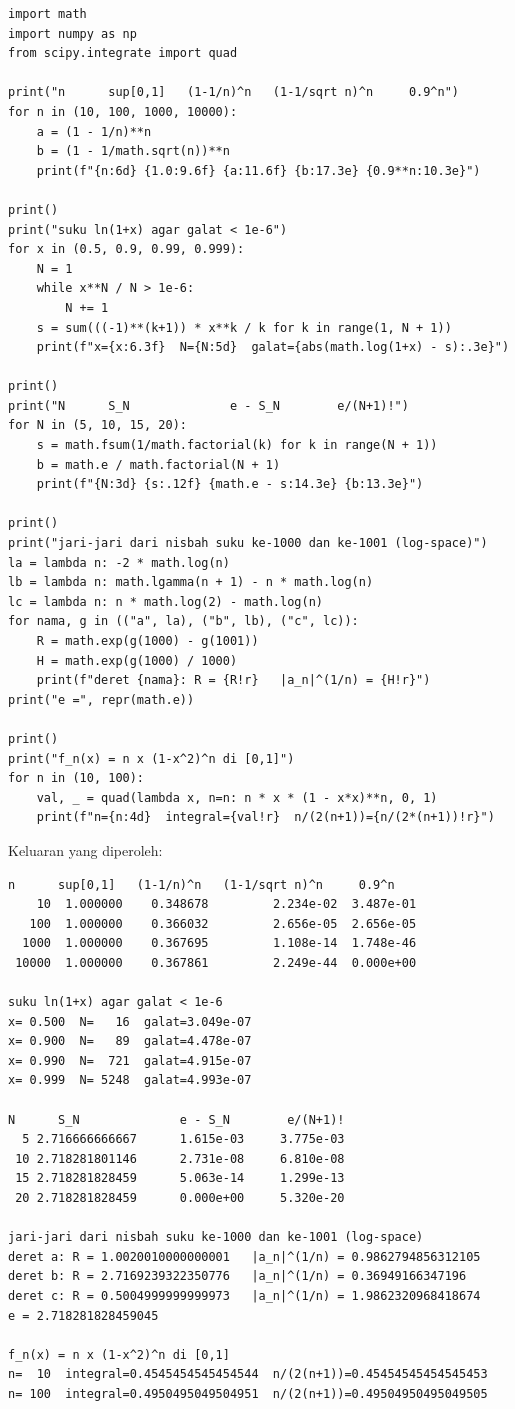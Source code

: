 \begin{lab}
\begin{verbatim}
import math
import numpy as np
from scipy.integrate import quad

print("n      sup[0,1]   (1-1/n)^n   (1-1/sqrt n)^n     0.9^n")
for n in (10, 100, 1000, 10000):
    a = (1 - 1/n)**n
    b = (1 - 1/math.sqrt(n))**n
    print(f"{n:6d} {1.0:9.6f} {a:11.6f} {b:17.3e} {0.9**n:10.3e}")

print()
print("suku ln(1+x) agar galat < 1e-6")
for x in (0.5, 0.9, 0.99, 0.999):
    N = 1
    while x**N / N > 1e-6:
        N += 1
    s = sum(((-1)**(k+1)) * x**k / k for k in range(1, N + 1))
    print(f"x={x:6.3f}  N={N:5d}  galat={abs(math.log(1+x) - s):.3e}")

print()
print("N      S_N              e - S_N        e/(N+1)!")
for N in (5, 10, 15, 20):
    s = math.fsum(1/math.factorial(k) for k in range(N + 1))
    b = math.e / math.factorial(N + 1)
    print(f"{N:3d} {s:.12f} {math.e - s:14.3e} {b:13.3e}")

print()
print("jari-jari dari nisbah suku ke-1000 dan ke-1001 (log-space)")
la = lambda n: -2 * math.log(n)
lb = lambda n: math.lgamma(n + 1) - n * math.log(n)
lc = lambda n: n * math.log(2) - math.log(n)
for nama, g in (("a", la), ("b", lb), ("c", lc)):
    R = math.exp(g(1000) - g(1001))
    H = math.exp(g(1000) / 1000)
    print(f"deret {nama}: R = {R!r}   |a_n|^(1/n) = {H!r}")
print("e =", repr(math.e))

print()
print("f_n(x) = n x (1-x^2)^n di [0,1]")
for n in (10, 100):
    val, _ = quad(lambda x, n=n: n * x * (1 - x*x)**n, 0, 1)
    print(f"n={n:4d}  integral={val!r}  n/(2(n+1))={n/(2*(n+1))!r}")
\end{verbatim}
\end{lab}

Keluaran yang diperoleh:

\begin{verbatim}
n      sup[0,1]   (1-1/n)^n   (1-1/sqrt n)^n     0.9^n
    10  1.000000    0.348678         2.234e-02  3.487e-01
   100  1.000000    0.366032         2.656e-05  2.656e-05
  1000  1.000000    0.367695         1.108e-14  1.748e-46
 10000  1.000000    0.367861         2.249e-44  0.000e+00

suku ln(1+x) agar galat < 1e-6
x= 0.500  N=   16  galat=3.049e-07
x= 0.900  N=   89  galat=4.478e-07
x= 0.990  N=  721  galat=4.915e-07
x= 0.999  N= 5248  galat=4.993e-07

N      S_N              e - S_N        e/(N+1)!
  5 2.716666666667      1.615e-03     3.775e-03
 10 2.718281801146      2.731e-08     6.810e-08
 15 2.718281828459      5.063e-14     1.299e-13
 20 2.718281828459      0.000e+00     5.320e-20

jari-jari dari nisbah suku ke-1000 dan ke-1001 (log-space)
deret a: R = 1.0020010000000001   |a_n|^(1/n) = 0.9862794856312105
deret b: R = 2.7169239322350776   |a_n|^(1/n) = 0.36949166347196
deret c: R = 0.5004999999999973   |a_n|^(1/n) = 1.9862320968418674
e = 2.718281828459045

f_n(x) = n x (1-x^2)^n di [0,1]
n=  10  integral=0.4545454545454544  n/(2(n+1))=0.45454545454545453
n= 100  integral=0.4950495049504951  n/(2(n+1))=0.49504950495049505
\end{verbatim}

